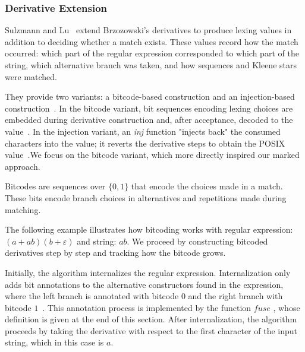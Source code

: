 \documentclass[12pt]{article}
\newcommand{\fuse}{\textit{fuse }}
\begin{document}
\subsubsection{Derivative Extension}

Sulzmann and Lu~\cite{Sulzmann2014} extend Brzozowski’s derivatives to produce lexing values in addition to deciding whether a match exists. 
These values record how the match occurred: which part of the regular expression corresponded to which part of the string, 
which alternative branch was taken, and how sequences and Kleene stars were matched.

They provide two variants: a bitcode-based construction and an injection-based construction~\cite{Sulzmann2014}.
In the bitcode variant, bit sequences encoding lexing choices are embedded during derivative construction and, after acceptance, decoded to
the value~\cite{Sulzmann2014}. In the injection variant, an \textit{inj} function "injects back" the consumed characters into the value; it reverts 
the derivative steps to obtain the POSIX value~\cite{Sulzmann2014}.We focus on the bitcode variant, which more directly inspired our marked approach.

Bitcodes are  sequences over $\{0,1\}$ that encode the choices made in a match.
These bits encode branch choices in alternatives and repetitions made during matching.

The following example illustrates how bitcoding works with regular expression: $(a+ab)(b+\varepsilon)$ and string: $ab$. 
We proceed by constructing bitcoded derivatives step by step and tracking how the bitcode grows.

Initially, the algorithm internalizes the regular expression. 
Internalization only adds bit annotations to the alternative constructors found in the expression, 
where the left branch is annotated with bitcode $0$ and the right branch with bitcode $1$~\cite{Sulzmann2014}. 
This annotation process is implemented by the function $\fuse$, whose definition is given at the end of this section. 
After internalization, the algorithm proceeds by taking the derivative with respect to the first character 
of the input string, which in this case is $a$.
\end{document}

